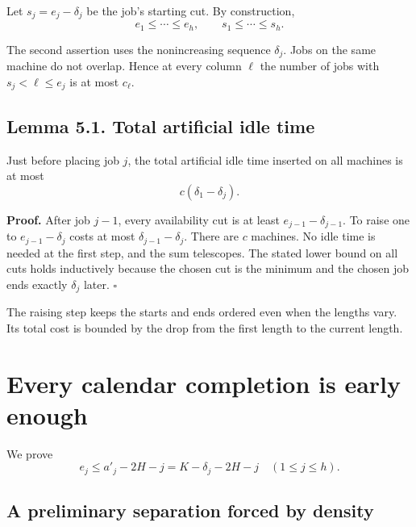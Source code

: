 \documentclass[11pt,a4paper]{article}
\begin{document}
Let \(s_j=e_j-\delta_j\) be the job's starting cut. By construction,
\begin{equation}
e_1\le\cdots\le e_h,
\qquad s_1\le\cdots\le s_h.
\tag{5.1}
\label{eq:5.1}
\end{equation}

The second assertion uses the nonincreasing sequence \(\delta_j\). Jobs on the same machine do not overlap. Hence at every column \(\ell\) the number of jobs with \(s_j<\ell\le e_j\) is at most \(c_\ell\).

\hypertarget{lemma-5.1.-total-artificial-idle-time}{%
\subsection*{Lemma 5.1. Total artificial idle time}\label{lemma-5.1.-total-artificial-idle-time}}

Just before placing job \(j\), the total artificial idle time inserted on all machines is at most
\begin{equation}
c(\delta_1-\delta_j).
\tag{5.2}
\label{eq:5.2}
\end{equation}

\textbf{Proof.} After job \(j-1\), every availability cut is at least \(e_{j-1}-\delta_{j-1}\). To raise one to \(e_{j-1}-\delta_j\) costs at most \(\delta_{j-1}-\delta_j\). There are \(c\) machines. No idle time is needed at the first step, and the sum telescopes. The stated lower bound on all cuts holds inductively because the chosen cut is the minimum and the chosen job ends exactly \(\delta_j\) later. \(\square\)

The raising step keeps the starts and ends ordered even when the lengths vary. Its total cost is bounded by the drop from the first length to the current length.

\hypertarget{every-calendar-completion-is-early-enough}{%
\section{Every calendar completion is early enough}\label{every-calendar-completion-is-early-enough}}

We prove
\begin{equation}
\boxed{e_j\le a'_j-2H-j=K-\delta_j-2H-j
\quad(1\le j\le h).}
\tag{6.1}
\label{eq:6.1}
\end{equation}

\hypertarget{a-preliminary-separation-forced-by-density}{%
\subsection{A preliminary separation forced by density}\label{a-preliminary-separation-forced-by-density}}
\end{document}
